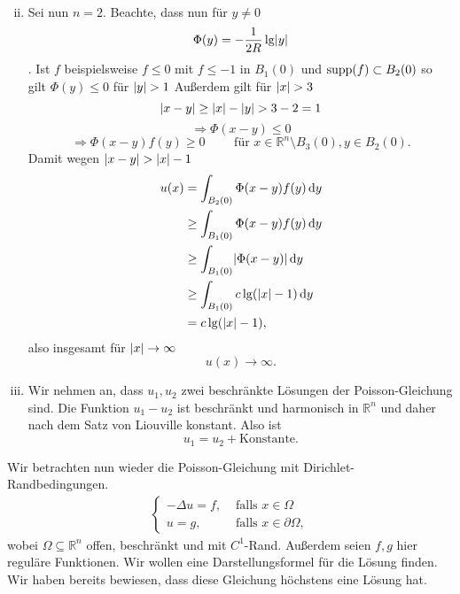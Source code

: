 \begin{bemerkung}
\begin{beweis}
\begin{enumerate}[(i)]
\begin{align*}
			\end{align*}
			\item Sei nun $n=2$. Beachte, dass nun für $y \neq 0$
			\[
				\Phi(y) = - \frac{1}{2R} \lg \lvert y\rvert
			\]. Ist $f$ beispielsweise $f \leq 0$ mit $f \leq -1$ in $B_1(0)$ und $\operatorname{supp} (f) \subset B_2(0)$ so gilt $\Phi(y) \leq 0$ für $\lvert y\rvert> 1$ 
			Außerdem gilt für $\lvert x\rvert > 3$
			\[
				\lvert x-y\rvert \geq \lvert x\rvert-\lvert y\rvert > 3- 2 = 1
			\]
			\begin{equation}
				\Rightarrow \Phi(x-y) \leq 0
			\end{equation}
			\begin{equation}
				\Rightarrow \Phi(x-y)f(y) \geq 0 \qquad \text{ für } x \in \mathbb{R}^n \setminus B_3(0), y \in B_2(0).
			\end{equation}
			Damit wegen $\lvert x-y\rvert > \lvert x\rvert-1$
			\begin{align*}
					u(x) &= \int_{B_2(0)}^{} \Phi(x-y) f(y) \,\mathrm{d}y \\
					& \geq \int_{B_1(0)}^{} \Phi(x-y)f(y) \,\mathrm{d}y \\
					& \geq  \int_{B_1(0)}^{} \lvert\Phi(x-y)\rvert \,\mathrm{d}y \\
					& \geq  \int_{B_1(0)}^{} c \lg ( \lvert x\rvert-1) \,\mathrm{d}y \\
					&= c \lg(\lvert x\rvert-1),
			\end{align*}
			also insgesamt für $\lvert x\rvert \to \infty$
			\begin{equation}
				u(x) \to  \infty.
			\end{equation}
		\item Wir nehmen an, dass $u_1,u_2$ zwei beschränkte Lösungen der Poisson-Gleichung sind. 
		Die Funktion $u_1-u_2$ ist beschränkt und harmonisch in $\mathbb{R}^n$ und daher nach dem Satz von Liouville konstant. Also ist 
		\begin{equation}
			u_1 = u_2 + \text{Konstante}.
		\end{equation}
		\end{enumerate}
	\end{beweis}
\end{bemerkung}

Wir betrachten nun wieder die Poisson-Gleichung mit Dirichlet-Randbedingungen.
\begin{align*}
	\begin{cases}
		- \Delta u = f, &\text{ falls }x \in \Omega\\
		u =g, &\text{ falls } x \in \partial \Omega,
	\end{cases}
\end{align*}
wobei $\Omega \subseteq \mathbb{R}^n$ offen, beschränkt und mit $C^1$-Rand. Außerdem seien $f,g$ hier reguläre Funktionen.
Wir wollen eine Darstellungsformel für die Lösung finden. Wir haben bereits bewiesen, dass diese Gleichung höchstens eine Lösung hat.

